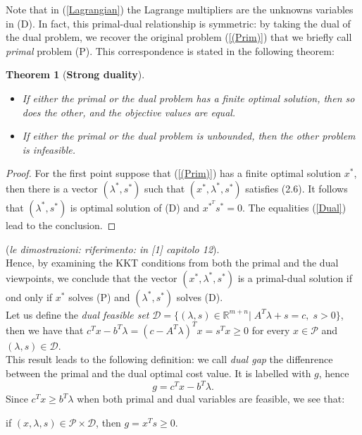 \documentclass[a4paper,10 pt,titlepage,twoside]{book}
\theoremstyle{plain}
\newtheorem{thm}{Theorem}[chapter]
\theoremstyle{definition}
\theoremstyle{remark}
\begin{document}
Note that in (\ref{Lagrangian}) the Lagrange multipliers are the unknowns variables in (D). In fact, this primal-dual relationship is symmetric: by taking the dual of the dual problem, we recover the original problem (\ref{(Prim)}) that we briefly call \textit{primal} problem (P). This correspondence is stated in the following theorem:
\begin{thm}[\textbf{Strong duality}] 
	\begin{itemize}
		\
		\item If either the primal or the dual problem has a finite optimal solution, then so does the other, and the objective values are equal.
		\item If either the primal or the dual problem is unbounded, then the other problem is infeasible.
	\end{itemize}
\end{thm}
\begin{proof}
For the first point suppose that (\ref{(Prim)}) has a finite optimal solution $x^{*}$, then there is a vector $(\lambda^{*},s^{*})$ such that $\left( x^{*},\lambda^{*},s^{*}\right)$ satisfies (2.6). It follows that $\left(\lambda^{*},s^{*}\right)$ is optimal solution of (D) and $x^{*}^{T}s^{*}=0$. The equalities (\ref{Dual}) lead to the conclusion. 
\end{proof}
(\textit{le dimostrazioni: riferimento: in [1] capitolo 12}).\\[0.5 cm] Hence, by examining the KKT conditions from both the primal and the dual viewpoints, we conclude that the vector $(x^{*},\lambda^{*},s^{*})$ is a primal-dual solution if ond only if $x^{*}$ solves (P) and $(\lambda^{*},s^{*})$ solves (D).\\[1cm]
Let us define the \textit{dual feasible set} $\mathcal{D}=\{(\lambda,s)\in\mathbb{R}^{m+n}|\;A^{T}\lambda+s= c,\;s>0\}$, then we have that $c^{T}x-b^{T}\lambda=\left(c-A^{T}\lambda\right)^{T}x=s^{T}x \geq0$ for every $x\in\mathcal{P}$ and $\left(\lambda,s\right)\in\mathcal{D}$.\\
This result leads to the following definition: we call \textit{dual gap} the diffenrence between the primal and the dual optimal cost value. It is labelled with $g$, hence
\begin{equation}\label{dualgap}
g = c^{T}x - b^{T}\lambda.
\end{equation}
Since $c^{T}x\geq b^{T}\lambda$ when both primal and dual variables are feasible, we see that:\begin{center}
	if $(x,\lambda,s)\in\mathcal{P}\times\mathcal{D}$, then $g= x^{T}s \geq0$.
\end{center}
\end{document}
